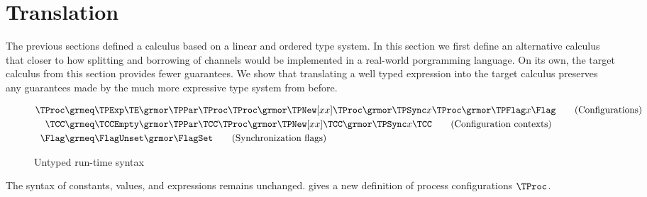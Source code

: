 \clearpage
\section{Translation}
\label{sec:translation}

The previous sections defined a calculus based on a linear and ordered type
system. In this section we first define an alternative calculus that closer to
how splitting and borrowing of channels would be implemented in a real-world
porgramming language. On its own, the target calculus from this section
provides fewer guarantees. We show that translating a well typed expression
into the target calculus preserves any guarantees made by the much more
expressive type system from before.

\begin{figure}
  \setlength{\abovedisplayskip}{0pt}%
  \setlength{\belowdisplayskip}{0pt}%
  \begin{align*}
    \TProc \grmeq
        & \TPExp\TE
          \grmor \TPPar\TProc\TProc
          \grmor \TPNew[xx] \TProc
          \grmor \TPSync x \TProc
          \grmor \TPFlag x \Flag
      \tag{Configurations}
    \\
    \TCC
      \grmeq& \TCCEmpty
      \grmor \TPPar \TCC \TProc
      \grmor \TPNew[xx] \TCC
      \grmor \TPSync x \TCC
      \tag{Configuration contexts}
    \\
    \Flag \grmeq & \FlagUnset \grmor \FlagSet
      \tag{Synchronization flags}
  \end{align*}
  \caption{Untyped run-time syntax}
  \label{fig:unr-syntax}
\end{figure}

The syntax of constants, values, and expressions remains unchanged.
 gives a new definition of process configurations $\TProc$.

